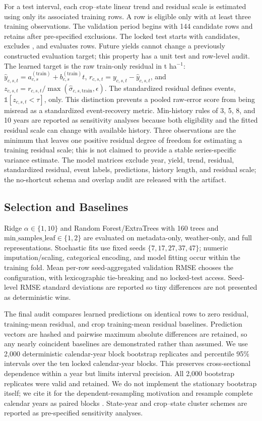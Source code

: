 \documentclass[conference]{IEEEtran}
\begin{document}
For a test interval, each crop--state linear trend and residual scale is estimated
using only its associated training rows. A row is eligible only with at least three
training observations. The validation period begins with 144 candidate rows and
retains \AuditValidationRows{} after \AuditValidationExcluded{} pre-specified
exclusions. The locked test starts with \AuditTestCandidateRows{} candidates,
excludes \AuditTestExcluded{}, and evaluates \AuditTestRows{} rows. Future yields
cannot change a previously
constructed evaluation target; this property has a unit test and row-level audit.
The learned target is the raw train-only residual in t ha$^{-1}$:
$\hat{y}_{c,s,t}=a^{(\mathrm{train})}_{c,s}+b^{(\mathrm{train})}_{c,s}t$,
$r_{c,s,t}=y_{c,s,t}-\hat{y}_{c,s,t}$, and
$z_{c,s,t}=r_{c,s,t}/\max(\hat{\sigma}_{c,s,\mathrm{train}},\epsilon)$.
The standardized residual defines events, $\mathbb{1}[z_{c,s,t}<\tau]$, only.
This distinction prevents a pooled raw-error score from being misread as a
standardized event-recovery metric. Min-history rules of 3, 5, 8, and 10 years are
reported as sensitivity analyses because both eligibility and the fitted residual
scale can change with available history. Three observations are the minimum that
leaves one positive residual degree of freedom for estimating a training residual
scale; this is not claimed to provide a stable series-specific variance estimate.
The model matrices exclude year, yield, trend, residual, standardized residual,
event labels, predictions, history length, and residual scale; the no-shortcut
schema and overlap audit are released with the artifact.

\subsection{Selection and Baselines}
Ridge $\alpha\in\{1,10\}$ and Random Forest/ExtraTrees with 160 trees and
$\mathrm{min\_samples\_leaf}\in\{1,2\}$ are evaluated on metadata-only,
weather-only, and full representations. Stochastic fits use fixed seeds
$\{7,17,27,37,47\}$; numeric imputation/scaling, categorical encoding, and model
fitting occur within the training fold. Mean per-row seed-aggregated validation
RMSE chooses the configuration, with lexicographic tie-breaking and no locked-test
access. Seed-level RMSE standard deviations are reported so tiny differences are
not presented as deterministic wins.

The final audit compares learned predictions on identical rows to zero residual,
training-mean residual, and crop training-mean residual baselines. Prediction
vectors are hashed and pairwise maximum absolute differences are retained, so any
nearly coincident baselines are demonstrated rather than assumed. We use 2,000
deterministic calendar-year block bootstrap replicates and percentile 95\%
intervals over the ten locked calendar-year blocks. This preserves
cross-sectional dependence within a year but limits interval precision. All 2,000
bootstrap replicates were valid and retained.
We do not implement the stationary bootstrap itself; we cite it for the
dependent-resampling motivation and resample complete calendar years as paired
blocks \cite{PolitisRomano1994}. State-year and crop--state cluster schemes are
reported as pre-specified sensitivity analyses.
\end{document}
